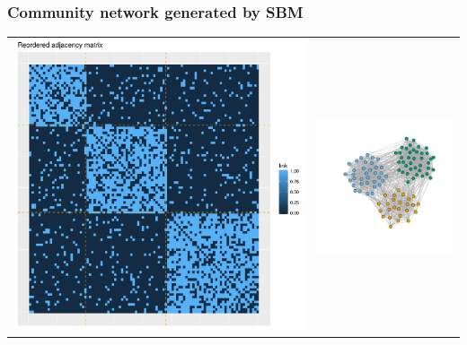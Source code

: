 \documentclass[compress,10pt]{beamer}
\begin{document}
\begin{frame}
\frametitle{Community network  generated by SBM}

\centering
\begin{tabular}{cc}
 \includegraphics[scale=.2]{plots/Affiliation_reordered_adja_with_groups.png}&
\includegraphics[scale=.2]{plots/Affiliation_graphe_with_colors.png} 
 \end{tabular}


\end{frame}
\end{document}
